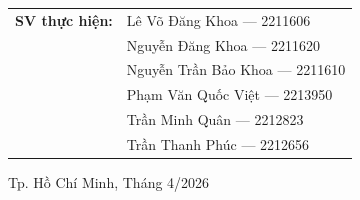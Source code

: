 \documentclass[a4paper]{article}
\theoremstyle{definition}
\begin{document}
\begin{titlepage}
\begin{table}[h]
\begin{tabular}{rl}
\textbf{\Large SV thực hiện:} & {\Large Lê Võ Đăng Khoa --- 2211606} \\[1em]
                    & {\Large Nguyễn Đăng Khoa --- 2211620} \\[1em]
                    & {\Large Nguyễn Trần Bảo Khoa --- 2211610} \\[1em]
                    & {\Large Phạm Văn Quốc Việt --- 2213950} \\[1em]
                    & {\Large Trần Minh Quân --- 2212823} \\[1em]
                    & {\Large Trần Thanh Phúc --- 2212656} \\[1em]
\end{tabular}
\end{table}

\vspace{0.5cm}

\begin{center}
  {\large Tp. Hồ Chí Minh, Tháng 4/2026}
\end{center}

\end{titlepage}
\thispagestyle{empty}
\newpage


\newpage
\tableofcontents
\newpage
\listoffigures
\newpage
\listoftables
\newpage
\setcounter{page}{1}


\newpage

\newpage
% 
% 
% 
% 

\newpage

\newpage


\newpage

\end{document}
